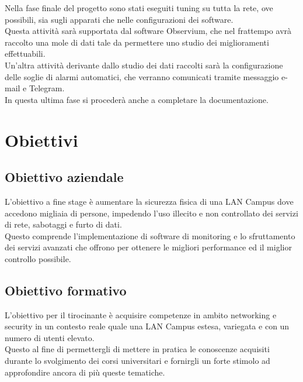 \documentclass[Tesi.tex]{subfiles}
\begin{document}
Nella fase finale del progetto sono stati eseguiti tuning su tutta la rete, ove possibili, sia sugli apparati che nelle configurazioni dei software. \\
Questa attività sarà supportata dal software Observium, che nel frattempo avrà raccolto una mole di dati tale da permettere uno studio dei miglioramenti effettuabili.\\
Un'altra attività derivante dallo studio dei dati raccolti sarà la configurazione delle soglie di alarmi automatici, che verranno comunicati tramite messaggio e-mail e Telegram. \\
In questa ultima fase si procederà anche a completare la documentazione. \\

\section{Obiettivi}
\subsection{Obiettivo aziendale}
L'obiettivo a fine stage è aumentare la sicurezza fisica di una LAN Campus dove accedono migliaia di
persone, impedendo l'uso illecito e non controllato dei servizi di rete, sabotaggi e furto di dati. \\
Questo comprende l'implementazione di software di monitoring e lo sfruttamento dei servizi avanzati che offrono per ottenere le migliori performance ed il miglior controllo possibile.

\subsection{Obiettivo formativo}
L'obiettivo per il tirocinante è acquisire competenze in ambito networking e security in un contesto reale quale una LAN Campus estesa, variegata e con un numero di utenti elevato. \\
Questo al fine di permettergli di mettere in pratica le conoscenze acquisiti durante lo svolgimento dei corsi universitari e fornirgli un forte stimolo ad approfondire ancora di più queste tematiche.
\end{document}
